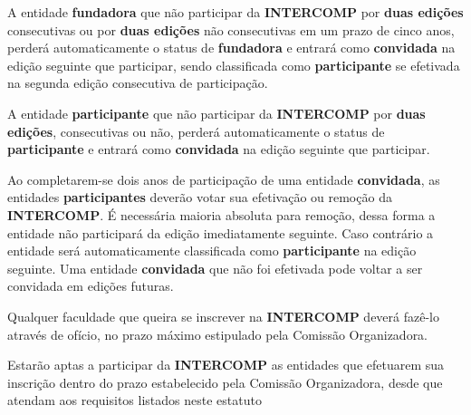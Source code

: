 \begin{article}
	\begin{xparagraph}
		A entidade \textbf{fundadora} que não participar da \textbf{INTERCOMP} por \textbf{duas edições} consecutivas ou por \textbf{duas edições} não consecutivas em um prazo de cinco anos, perderá automaticamente o status de \textbf{fundadora} e entrará como \textbf{convidada} na edição seguinte que participar, sendo classificada como \textbf{participante} se efetivada na segunda edição consecutiva de participação.
	\end{xparagraph}

	\begin{xparagraph}
		A entidade \textbf{participante} que não participar da \textbf{INTERCOMP} por \textbf{duas edições}, consecutivas ou não, perderá automaticamente o status de \textbf{participante} e entrará como \textbf{convidada} na edição seguinte que participar.
	\end{xparagraph}
\end{article}

\begin{article}
	Ao completarem-se dois anos de participação de uma entidade \textbf{convidada}, as entidades \textbf{participantes} deverão votar sua efetivação ou remoção da \textbf{INTERCOMP}. É necessária maioria absoluta para remoção, dessa forma a entidade não participará da edição imediatamente seguinte. Caso contrário a entidade será automaticamente classificada como \textbf{participante} na edição seguinte. Uma entidade \textbf{convidada} que não foi efetivada pode voltar a ser convidada em edições futuras.
\end{article}

\begin{article}
	Qualquer faculdade que queira se inscrever na \textbf{INTERCOMP} deverá fazê-lo através de ofício, no prazo máximo estipulado pela Comissão Organizadora.
\end{article}

\begin{article}
	Estarão aptas a participar da \textbf{INTERCOMP} as entidades que efetuarem sua inscrição dentro do prazo estabelecido pela Comissão Organizadora, desde que atendam aos requisitos listados neste estatuto
\end{article}
